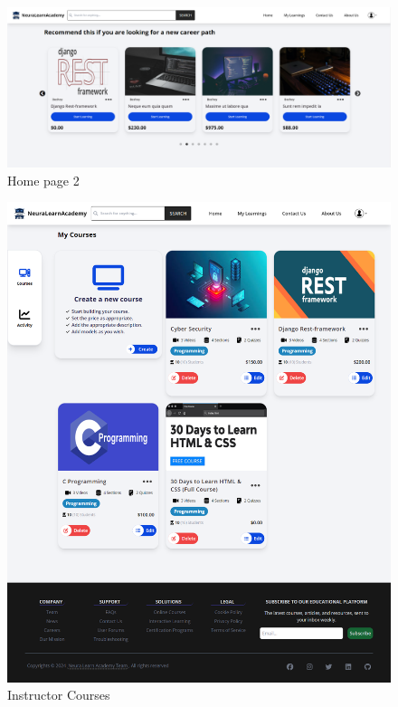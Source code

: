 \begin{figure}[h!]
	\centering
	\includegraphics[max height=\textheight,max width=\textwidth]{figures/frontend/Homepage2.png}
	\caption{Home page 2}
\end{figure}

\begin{figure}[h!]
	\centering
	\includegraphics[max height=\textheight,max width=\textwidth]{figures/frontend/instructor courses page.png}
	\caption{Instructor Courses}
\end{figure}


